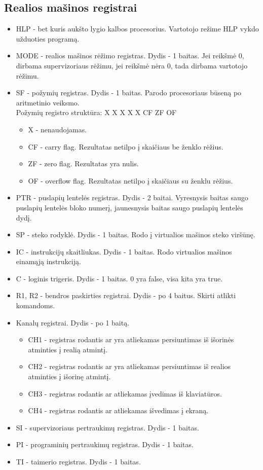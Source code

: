 \documentclass[12pt]{article}
\begin{document}
	\subsection{Realios mašinos registrai}
	\begin{itemize}
	\item HLP - bet kuris aukšto lygio kalbos procesorius. Vartotojo režime HLP vykdo užduoties programą.
	\item MODE - realios mašinos rėžimo registras. Dydis - 1 baitas. Jei reikšmė 0, dirbama supervizoriaus rėžimu, jei reikšmė nėra 0, tada dirbama vartotojo rėžimu.
	\item SF - požymių registras. Dydis - 1 baitas. Parodo procesoriaus būseną po aritmetinio veiksmo.\\
	Požymių registro struktūra: X X X X X CF ZF OF
	\begin{itemize}
		\item X - nenaudojamas.
		\item CF - carry flag. Rezultatas netilpo į skaičiaus be ženklo rėžius.
		\item ZF - zero flag. Rezultatas yra nulis.
		\item OF - overflow flag. Rezultatas netilpo į skaičiaus su ženklu rėžius.
	\end{itemize}
	\item PTR - puslapių lentelės registras. Dydis - 2 baitai. Vyresnysis baitas saugo puslapių lentelės bloko numerį, jaunesnysis baitas saugo puslapių lentelės dydį.
	\item SP - steko rodyklė. Dydis - 1 baitas. Rodo į virtualios mašinos steko viršūnę.
	\item IC - instrukcijų skaitliukas. Dydis - 1 baitas. Rodo virtualios mašinos einamąją instrukciją.
	\item C - loginis trigeris. Dydis - 1 baitas. 0 yra false, visa kita yra true.
	\item R1, R2 - bendros paskirties registrai. Dydis - po 4 baitus. Skirti atlikti komandoms.
	\item Kanalų registrai. Dydis - po 1 baitą.
	\begin{itemize}
		\item CH1 - registras rodantis ar yra atliekamas persiuntimas iš išorinės atminties į realią atmintį.
		\item CH2 - registras rodantis ar yra atliekamas persiuntimas iš realios atminties į išorinę atmintį.
		\item CH3 - registras rodantis ar atliekamas įvedimas iš klaviatūros.
		\item CH4 - registras rodantis ar atliekamas išvedimas į ekraną.
	\end{itemize}
	\item SI - supervizoriaus pertraukimų registras. Dydis - 1 baitas. 
	\item PI - programinių pertraukimų registras. Dydis - 1 baitas.
	\item TI - taimerio registras. Dydis - 1 baitas.
	
	\end{itemize}	
	
\end{document}
